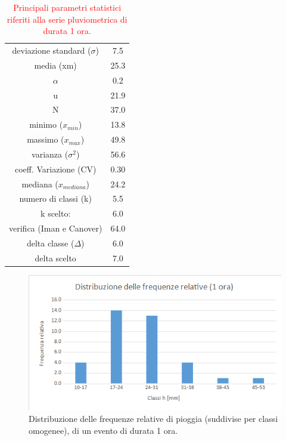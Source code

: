 \begin{table}[H] \centering
    \caption{\textcolor{red}{Principali parametri statistici riferiti alla serie pluviometrica di durata 1 ora.}}
        \begin{tabular}{cc}
    \toprule
        deviazione standard ($\sigma$)   & 7.5  \\
        media (xm)                & 25.3 \\
        $\alpha$                & 0.2  \\
        u                & 21.9 \\
        N                & 37.0 \\
        minimo ($x_{min}$)             & 13.8 \\
        massimo ($x_{max}$)            & 49.8 \\
        varianza ($\sigma ^2$)             & 56.6 \\
        coeff. Variazione (CV)    & 0.30 \\
        mediana ($x_{mediana}$)        & 24.2 \\
        numero di classi (k)      & 5.5  \\
        k scelto:                 & 6.0  \\
        verifica (Iman e Canover) & 64.0 \\
        delta classe ($\Delta$)          & 6.0  \\
        delta scelto             & 7.0 \\
        \bottomrule 
 \end{tabular}
\end{table}

\begin{figure}[H]\centering
    \includegraphics[scale=.6]{immagini/freq_piogg_rel_1ora.png}
    \caption{Distribuzione delle frequenze relative di pioggia (suddivise per classi omogenee), di un evento di durata 1 ora.}
  \label{freq_rel_piogg_05ore}
\end{figure}

